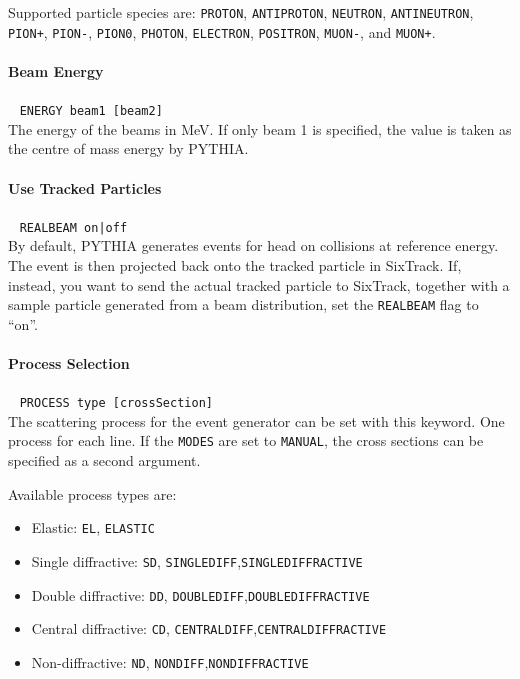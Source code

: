 Supported particle species are: \texttt{PROTON}, \texttt{ANTIPROTON}, \texttt{NEUTRON}, \texttt{ANTINEUTRON}, \texttt{PION+}, \texttt{PION-}, \texttt{PION0}, \texttt{PHOTON}, \texttt{ELECTRON}, \texttt{POSITRON}, \texttt{MUON-}, and \texttt{MUON+}.

\paragraph{Beam Energy}~ \texttt{ENERGY beam1 [beam2]}\\

The energy of the beams in MeV.
If only beam 1 is specified, the value is taken as the centre of mass energy by PYTHIA.

\paragraph{Use Tracked Particles}~ \texttt{REALBEAM on|off}\\

By default, PYTHIA generates events for head on collisions at reference energy.
The event is then projected back onto the tracked particle in SixTrack.
If, instead, you want to send the actual tracked particle to SixTrack, together with a sample particle generated from a beam distribution, set the \texttt{REALBEAM} flag to ``on''.

\paragraph{Process Selection}~ \texttt{PROCESS type [crossSection]}\\

The scattering process for the event generator can be set with this keyword.
One process for each line.
If the \texttt{MODES} are set to \texttt{MANUAL}, the cross sections can be specified as a second argument.

\bigskip
\noindent Available process types are:
\begin{itemize}
  \item Elastic: \texttt{EL}, \texttt{ELASTIC}
  \item Single diffractive: \texttt{SD}, \texttt{SINGLEDIFF},\texttt{SINGLEDIFFRACTIVE}
  \item Double diffractive: \texttt{DD}, \texttt{DOUBLEDIFF},\texttt{DOUBLEDIFFRACTIVE}
  \item Central diffractive: \texttt{CD}, \texttt{CENTRALDIFF},\texttt{CENTRALDIFFRACTIVE}
  \item Non-diffractive: \texttt{ND}, \texttt{NONDIFF},\texttt{NONDIFFRACTIVE}
\end{itemize}

